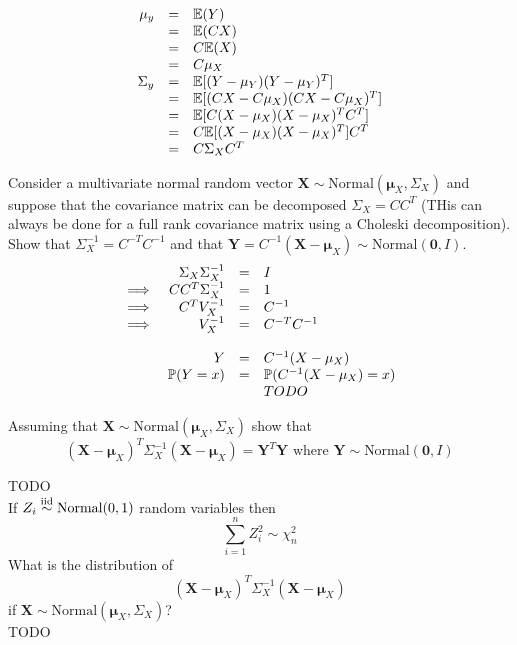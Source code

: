 \documentclass[11pt,a4paper]{article}
\begin{document}
\apart
\[\begin{array}{rcl}
\mu_y&=&\mathbb{E}(Y)\\
&=&\mathbb{E}(CX)\\
&=&C\mathbb{E}(X)\\
&=&C\mu_X\\
\Sigma_y&=&\mathbb{E}[(Y-\mu_Y)(Y-\mu_Y)^T]\\
&=&\mathbb{E}[(CX-C\mu_X)(CX-C\mu_X)^T]\\
&=&\mathbb{E}[C(X-\mu_X)(X-\mu_X)^TC^T]\\
&=&C\mathbb{E}[(X-\mu_X)(X-\mu_X)^T]C^T\\
&=&C\Sigma_XC^T
\end{array}\]

\qpart
Consider a multivariate normal random vector $\textbf{X}\sim\text{Normal}(\pmb\mu_X,\Sigma_X)$ and suppose that the covariance matrix can be decomposed $\Sigma_X=CC^T$ (THis can always be done for a full rank covariance matrix using a Choleski decomposition). Show that $\Sigma_X^{-1}=C^{-T}C^{-1}$ and that ${\textbf{Y}=C^{-1}(\textbf{X}-\pmb\mu_X)\sim\text{Normal}(\textbf{0},I)}$.\\

\apart
\[\begin{array}{rrcl}
&\Sigma_X\Sigma_X^{-1}&=&I\\
\implies&CC^T\Sigma_X^{-1}&=&1\\
\implies&C^TV_X^{-1}&=&C^{-1}\\
\implies&V_X^{-1}&=&C^{-T}C^{-1}\\
\\
&Y&=&C^{-1}(X-\mu_X)\\
&\mathbb{P}(Y=x)&=&\mathbb{P}(C^{-1}(X-\mu_X)=x)\\
&&&TODO
\end{array}\]

\qpart
Assuming that $\textbf{X}\sim\text{Normal}(\pmb\mu_X,\Sigma_X)$ show that
$$(\textbf{X}-\pmb\mu_X)^T\Sigma_X^{-1}(\textbf{X}-\pmb\mu_X)=\textbf{Y}^T\textbf{Y}\text{ where }\textbf{Y}\sim\text{Normal}(\textbf{0},I)$$

\apart
TODO\\

\qpart
If $Z_i\overset{\text{iid}}{\sim}\text{Normal}(0,1)$ random variables then
$$\sum_{i=1}^nZ_i^2\sim\chi^2_n$$
What is the distribution of
$$(\textbf{X}-\pmb\mu_X)^T\Sigma_X^{-1}(\textbf{X}-\pmb\mu_X)$$
if $\textbf{X}\sim\text{Normal}(\pmb\mu_X,\Sigma_X)$?\\

\apart
TODO\\
\end{document}
